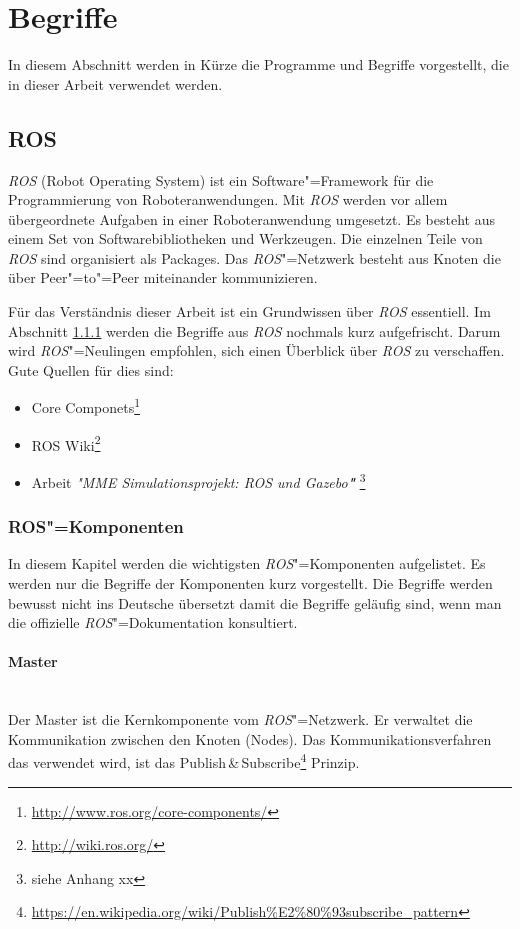 \section{Begriffe}
In diesem Abschnitt werden in Kürze die Programme und Begriffe vorgestellt, die in dieser Arbeit verwendet werden.

\subsection{ROS}
\textit{ROS} (Robot Operating System) ist ein Software"=Framework für die Programmierung von Roboteranwendungen.
Mit \textit{ROS} werden vor allem übergeordnete Aufgaben in einer Roboteranwendung umgesetzt.
Es besteht aus einem Set von Softwarebibliotheken und Werkzeugen.
Die einzelnen Teile von \textit{ROS} sind organisiert als Packages.
Das \textit{ROS}"=Netzwerk besteht aus Knoten die über Peer"=to"=Peer miteinander kommunizieren.

Für das Verständnis dieser Arbeit ist ein Grundwissen über \textit{ROS} essentiell.
Im Abschnitt \ref{chap:ros-komponenten} werden die Begriffe aus \textit{ROS} nochmals kurz aufgefrischt.
Darum wird \textit{ROS}"=Neulingen empfohlen, sich einen Überblick über \textit{ROS} zu verschaffen.
Gute Quellen für dies sind:
\begin{itemize}
\item Core Componets\footnote{\url{http://www.ros.org/core-components/}} 
\item ROS Wiki\footnote{\url{http://wiki.ros.org/}}
\item Arbeit \textit{\textsc{"}MME Simulationsprojekt: ROS und Gazebo\textbf{"}} \footnote{siehe Anhang xx} %
\end{itemize}

\subsubsection{ROS"=Komponenten}
\label{chap:ros-komponenten}
In diesem Kapitel werden die wichtigsten \textit{ROS}"=Komponenten aufgelistet.
Es werden nur die Begriffe der Komponenten kurz vorgestellt.
Die Begriffe werden bewusst nicht ins Deutsche übersetzt damit die Begriffe geläufig sind, wenn man die offizielle \textit{ROS}"=Dokumentation konsultiert.

\paragraph*{Master} \mbox{}\\
Der Master ist die Kernkomponente vom \textit{ROS}"=Netzwerk.
Er verwaltet die Kommunikation zwischen den Knoten (Nodes).
Das Kommunikationsverfahren das verwendet wird, ist das Publish\,\&\,Subscribe\footnote{\url{https://en.wikipedia.org/wiki/Publish\%E2\%80\%93subscribe_pattern}}  Prinzip. 

